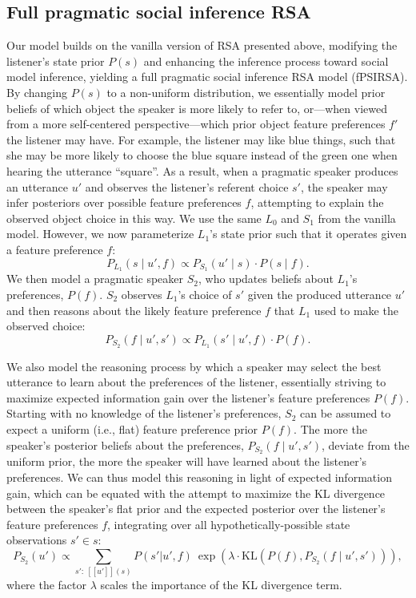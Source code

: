 \documentclass[10pt,a4paper]{article}
\newcommand{\gcs}[1]{\textcolor{blue}{[gcs: #1]}}
\begin{document}
\subsection{Full pragmatic social inference RSA}
Our model builds on the vanilla version of RSA presented above, modifying the listener's state prior $P(s)$ and enhancing the inference process toward social model inference, yielding a full pragmatic social inference RSA model (fPSIRSA). %
By changing $P(s)$ to a non-uniform distribution, we essentially model prior beliefs of which object the speaker is more likely to refer to, or---when viewed from a more self-centered perspective---which prior object feature preferences $f'$ the listener may have. 
For example, the listener may like blue things, such that she may be more likely to choose the blue square instead of the green one when hearing the utterance ``square''.
As a result, when a pragmatic speaker produces an utterance $u'$ and observes the listener's referent choice $s'$, the speaker may infer posteriors over possible feature preferences $f$, attempting to explain the observed object choice in this way.
We use the same $L_0$ and $S_1$ from the vanilla model.
However, we now parameterize $L_1$'s state prior such that it operates given a feature preference $f$:
$$P_{L_{1}}(s\mid u',f) \propto P_{S_{1}}(u' \mid s) \cdot P(s \mid f).$$
We then model a pragmatic speaker $S_2$, who updates beliefs about $L_1$'s preferences, $P(f)$.
$S_2$ observes $L_1$'s choice of $s'$ given the produced utterance $u'$ and then reasons about the likely feature preference $f$ that $L_1$ used to make the observed choice:
$$P_{S_{2}}(f\mid u',s') \propto P_{L_{1}}(s'\mid u',f) \cdot P(f).$$

We also model the reasoning process by which a speaker may select the best utterance to learn about the preferences of the listener, essentially striving to maximize expected information gain over the listener's feature preferences $P(f)$.
Starting with no knowledge of the listener's preferences, $S_2$ can be assumed to expect a uniform (i.e., flat) feature preference prior $P(f)$.
The more the speaker's posterior beliefs about the preferences, $P_{S_{2}}(f\mid u',s')$, deviate from the uniform prior, the more the speaker will have learned about the listener's preferences. 
We can thus model this reasoning in light of expected information gain, which can be equated with the attempt to maximize the KL divergence between the speaker's flat prior and the expected posterior over the listener's feature preferences $f$, integrating over all hypothetically-possible state observations $s' \in s$: %
$$P_{S_2}(u') \propto \sum_{s':\  [\![u']\!](s)} P(s'|u',f)\ \exp(\lambda \cdot \textrm{KL}(P(f),P_{S_{2}}(f\mid u',s'))),$$
where the factor $\lambda$ scales the importance of the KL divergence term. 
\end{document}
